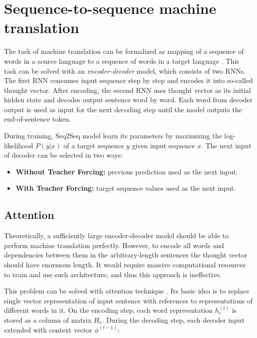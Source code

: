 \section{Sequence-to-sequence machine translation} \label{seq2seq}
The task of machine translation can be formalized as mapping of a sequence of words in a source language to a sequence of words in a target language \parencite{Neubig2017}. This task can be solved with an \emph{encoder-decoder} model, which consists of two RNNs. The first RNN consumes input sequence step by step and encodes it into so-called thought vector. After encoding, the second RNN uses thought vector as its initial hidden state and decodes output sentence word by word.  Each word from decoder output is used as input for the next decoding step until the model outputs the end-of-sentence token. 

During training, Seq2Seq model learn its parameters by maximizing the log-likelihood $P(y|x)$ of a target sequence $y$ given input sequence $x$. The next input of decoder can be selected in two ways:
    \begin{itemize}
    	\item \textbf{Without Teacher Forcing:} previous prediction used as the next input.
    	\item \textbf{With Teacher Forcing:} target sequence values used as the next input.
    \end{itemize}


\subsection{Attention} \label{attention}
Theoretically, a sufficiently large encoder-decoder model should be able to perform machine translation perfectly. However, to encode all words and dependencies between them in the arbitrary-length sentences the thought vector should have enormous length. It would require massive computational resources to train and use such architecture, and thus this approach is ineffective.

This problem can be solved with attention technique \parencite{Bahdanau2014}. Its basic idea is to replace single vector representation of input sentence with references to representations of different words in it. On the encoding step, each word representation $h_e^{(t)}$ is stored as a column of matrix $H_e$. During the decoding step, each decoder input extended with context vector $\phi^{(t-1)}$:

